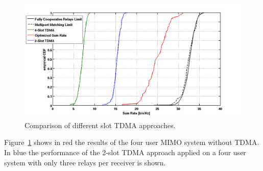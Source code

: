 \begin{figure}[h]
\centering
  \includegraphics[width=\linewidth]{images/SlotTDMAcomparison_edited.png}
\caption{Comparison of different slot TDMA approaches.}
\label{fig:tdma_comb}
\end{figure}


Figure~\ref{fig:tdma_comb} shows in red the results of the four user MIMO system without TDMA.
In blue the performance of the 2-slot TDMA approach applied on a four user system with only three relays per receiver is shown.









